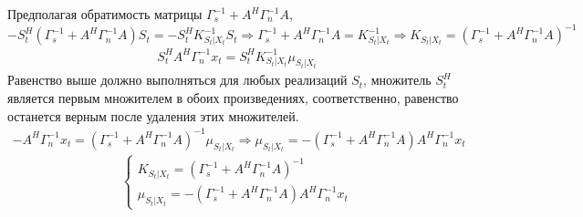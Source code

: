 \documentclass[11pt]{article}
\begin{document}
Предполагая обратимость матрицы $\Gamma_s^{-1}+ A^H \Gamma_n^{-1} A$,
\begin{equation*}
-S_t^H(\Gamma_s^{-1}+A^H \Gamma_n^{-1} A)S_t = -S_t^H K_{S_t|X_t}^{-1}S_t  \Rightarrow \Gamma_s^{-1}+ A^H \Gamma_n^{-1} A= K_{S_t|X_t}^{-1} \Rightarrow K_{S_t|X_t} = (\Gamma_s^{-1}+ A^H \Gamma_n^{-1} A)^{-1}
\end{equation*}
\begin{gather*}
S_t^H A^H\Gamma_n^{-1}x_t = S_t^H K_{S_t|X_t}^{-1}\mu_{S_t|X_t}
\end{gather*}
Равенство выше должно выполняться для любых реализаций $S_t$, множитель $S_t^H$ является первым множителем в обоих произведениях, соответственно, равенство останется верным после удаления этих множителей.
\begin{gather*}
-A^H\Gamma_n^{-1}x_t = (\Gamma_s^{-1}+ A^H \Gamma_n^{-1} A)^{-1} \mu_{S_t|X_t} \Rightarrow \mu_{S_t|X_t} =- (\Gamma_s^{-1}+ A^H \Gamma_n^{-1} A) A^H\Gamma_n^{-1}x_t
\end{gather*}
\begin{equation}
\left\{ \begin{gathered} 
K_{S_t|X_t} = (\Gamma_s^{-1}+ A^H \Gamma_n^{-1} A)^{-1} \\
\mu_{S_t|X_t} =- (\Gamma_s^{-1}+ A^H \Gamma_n^{-1} A) A^H\Gamma_n^{-1}x_t
\end{gathered} \right.
\end{equation}
\end{document}
